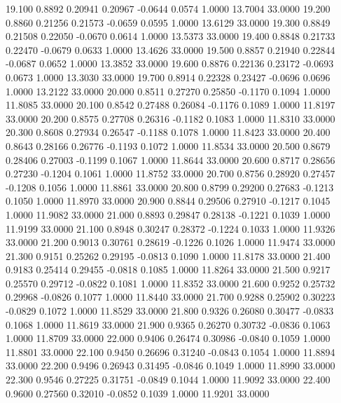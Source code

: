   19.100   0.8892   0.20941   0.20967  -0.0644   0.0574   1.0000  13.7004  33.0000
  19.200   0.8860   0.21256   0.21573  -0.0659   0.0595   1.0000  13.6129  33.0000
  19.300   0.8849   0.21508   0.22050  -0.0670   0.0614   1.0000  13.5373  33.0000
  19.400   0.8848   0.21733   0.22470  -0.0679   0.0633   1.0000  13.4626  33.0000
  19.500   0.8857   0.21940   0.22844  -0.0687   0.0652   1.0000  13.3852  33.0000
  19.600   0.8876   0.22136   0.23172  -0.0693   0.0673   1.0000  13.3030  33.0000
  19.700   0.8914   0.22328   0.23427  -0.0696   0.0696   1.0000  13.2122  33.0000
  20.000   0.8511   0.27270   0.25850  -0.1170   0.1094   1.0000  11.8085  33.0000
  20.100   0.8542   0.27488   0.26084  -0.1176   0.1089   1.0000  11.8197  33.0000
  20.200   0.8575   0.27708   0.26316  -0.1182   0.1083   1.0000  11.8310  33.0000
  20.300   0.8608   0.27934   0.26547  -0.1188   0.1078   1.0000  11.8423  33.0000
  20.400   0.8643   0.28166   0.26776  -0.1193   0.1072   1.0000  11.8534  33.0000
  20.500   0.8679   0.28406   0.27003  -0.1199   0.1067   1.0000  11.8644  33.0000
  20.600   0.8717   0.28656   0.27230  -0.1204   0.1061   1.0000  11.8752  33.0000
  20.700   0.8756   0.28920   0.27457  -0.1208   0.1056   1.0000  11.8861  33.0000
  20.800   0.8799   0.29200   0.27683  -0.1213   0.1050   1.0000  11.8970  33.0000
  20.900   0.8844   0.29506   0.27910  -0.1217   0.1045   1.0000  11.9082  33.0000
  21.000   0.8893   0.29847   0.28138  -0.1221   0.1039   1.0000  11.9199  33.0000
  21.100   0.8948   0.30247   0.28372  -0.1224   0.1033   1.0000  11.9326  33.0000
  21.200   0.9013   0.30761   0.28619  -0.1226   0.1026   1.0000  11.9474  33.0000
  21.300   0.9151   0.25262   0.29195  -0.0813   0.1090   1.0000  11.8178  33.0000
  21.400   0.9183   0.25414   0.29455  -0.0818   0.1085   1.0000  11.8264  33.0000
  21.500   0.9217   0.25570   0.29712  -0.0822   0.1081   1.0000  11.8352  33.0000
  21.600   0.9252   0.25732   0.29968  -0.0826   0.1077   1.0000  11.8440  33.0000
  21.700   0.9288   0.25902   0.30223  -0.0829   0.1072   1.0000  11.8529  33.0000
  21.800   0.9326   0.26080   0.30477  -0.0833   0.1068   1.0000  11.8619  33.0000
  21.900   0.9365   0.26270   0.30732  -0.0836   0.1063   1.0000  11.8709  33.0000
  22.000   0.9406   0.26474   0.30986  -0.0840   0.1059   1.0000  11.8801  33.0000
  22.100   0.9450   0.26696   0.31240  -0.0843   0.1054   1.0000  11.8894  33.0000
  22.200   0.9496   0.26943   0.31495  -0.0846   0.1049   1.0000  11.8990  33.0000
  22.300   0.9546   0.27225   0.31751  -0.0849   0.1044   1.0000  11.9092  33.0000
  22.400   0.9600   0.27560   0.32010  -0.0852   0.1039   1.0000  11.9201  33.0000
